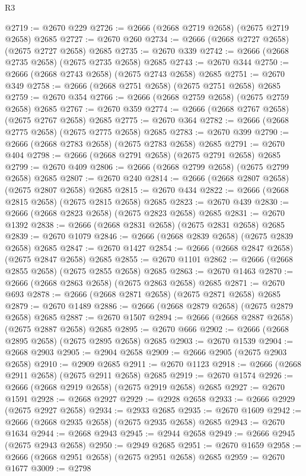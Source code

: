 \begin{lexlean}{R3}
\begin{coremodule}
@2719 := @2670 @229
@2726 := @2666 (@2668 @2719 @2658) (@2675 @2719 @2658) @2685
@2727 := @2670 @260
@2734 := @2666 (@2668 @2727 @2658) (@2675 @2727 @2658) @2685
@2735 := @2670 @339
@2742 := @2666 (@2668 @2735 @2658) (@2675 @2735 @2658) @2685
@2743 := @2670 @344
@2750 := @2666 (@2668 @2743 @2658) (@2675 @2743 @2658) @2685
@2751 := @2670 @349
@2758 := @2666 (@2668 @2751 @2658) (@2675 @2751 @2658) @2685
@2759 := @2670 @354
@2766 := @2666 (@2668 @2759 @2658) (@2675 @2759 @2658) @2685
@2767 := @2670 @359
@2774 := @2666 (@2668 @2767 @2658) (@2675 @2767 @2658) @2685
@2775 := @2670 @364
@2782 := @2666 (@2668 @2775 @2658) (@2675 @2775 @2658) @2685
@2783 := @2670 @399
@2790 := @2666 (@2668 @2783 @2658) (@2675 @2783 @2658) @2685
@2791 := @2670 @404
@2798 := @2666 (@2668 @2791 @2658) (@2675 @2791 @2658) @2685
@2799 := @2670 @409
@2806 := @2666 (@2668 @2799 @2658) (@2675 @2799 @2658) @2685
@2807 := @2670 @240
@2814 := @2666 (@2668 @2807 @2658) (@2675 @2807 @2658) @2685
@2815 := @2670 @434
@2822 := @2666 (@2668 @2815 @2658) (@2675 @2815 @2658) @2685
@2823 := @2670 @439
@2830 := @2666 (@2668 @2823 @2658) (@2675 @2823 @2658) @2685
@2831 := @2670 @1392
@2838 := @2666 (@2668 @2831 @2658) (@2675 @2831 @2658) @2685
@2839 := @2670 @1079
@2846 := @2666 (@2668 @2839 @2658) (@2675 @2839 @2658) @2685
@2847 := @2670 @1427
@2854 := @2666 (@2668 @2847 @2658) (@2675 @2847 @2658) @2685
@2855 := @2670 @1101
@2862 := @2666 (@2668 @2855 @2658) (@2675 @2855 @2658) @2685
@2863 := @2670 @1463
@2870 := @2666 (@2668 @2863 @2658) (@2675 @2863 @2658) @2685
@2871 := @2670 @693
@2878 := @2666 (@2668 @2871 @2658) (@2675 @2871 @2658) @2685
@2879 := @2670 @1489
@2886 := @2666 (@2668 @2879 @2658) (@2675 @2879 @2658) @2685
@2887 := @2670 @1507
@2894 := @2666 (@2668 @2887 @2658) (@2675 @2887 @2658) @2685
@2895 := @2670 @666
@2902 := @2666 (@2668 @2895 @2658) (@2675 @2895 @2658) @2685
@2903 := @2670 @1539
@2904 := @2668 @2903
@2905 := @2904 @2658
@2909 := @2666 @2905 (@2675 @2903 @2658)
@2910 := @2909 @2685
@2911 := @2670 @1123
@2918 := @2666 (@2668 @2911 @2658) (@2675 @2911 @2658) @2685
@2919 := @2670 @1574
@2926 := @2666 (@2668 @2919 @2658) (@2675 @2919 @2658) @2685
@2927 := @2670 @1591
@2928 := @2668 @2927
@2929 := @2928 @2658
@2933 := @2666 @2929 (@2675 @2927 @2658)
@2934 := @2933 @2685
@2935 := @2670 @1609
@2942 := @2666 (@2668 @2935 @2658) (@2675 @2935 @2658) @2685
@2943 := @2670 @1634
@2944 := @2668 @2943
@2945 := @2944 @2658
@2949 := @2666 @2945 (@2675 @2943 @2658)
@2950 := @2949 @2685
@2951 := @2670 @1659
@2958 := @2666 (@2668 @2951 @2658) (@2675 @2951 @2658) @2685
@2959 := @2670 @1677
@3009 := @2798

\end{coremodule}
\end{lexlean}
